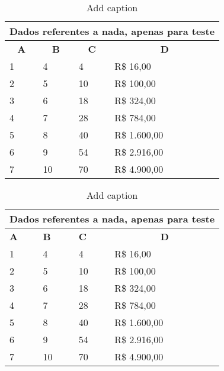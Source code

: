 \begin{table}[htbp]
	\centering
	\caption{Add caption}
	\begin{tabular}{m{2cm}|m{2cm}|m{2cm}|m{2.3cm}}
		\toprule
		\multicolumn{4}{c}{\textbf{Dados referentes a nada, apenas para teste}} \\
		\midrule
		\midrule
		\multicolumn{1}{c|}{\textcolor[rgb]{ 1,  0,  0}{\textbf{A}}} & \multicolumn{1}{c|}{\textcolor[rgb]{ 1,  0,  0}{\textbf{B}}} & \multicolumn{1}{c|}{\textcolor[rgb]{ 1,  0,  0}{\textbf{C}}} & \multicolumn{1}{c}{\textcolor[rgb]{ 1,  0,  0}{\textbf{D}}} \\
		\midrule
		\rowcolor[rgb]{ .851,  .851,  .851} 1     & 4     & 4     & R\$ 16,00 \\
		\midrule
		2     & 5     & 10    & R\$ 100,00 \\
		\midrule
		\rowcolor[rgb]{ .851,  .851,  .851} 3     & 6     & 18    & R\$ 324,00 \\
		\midrule
		4     & 7     & 28    & R\$ 784,00 \\
		\midrule
		\rowcolor[rgb]{ .851,  .851,  .851} 5     & 8     & 40    & R\$ 1.600,00 \\
		\midrule
		6     & 9     & 54    & R\$ 2.916,00 \\
		\midrule
		\rowcolor[rgb]{ .851,  .851,  .851} 7     & 10    & 70    & R\$ 4.900,00 \\
		\bottomrule
	\end{tabular}%
	\label{tab:addlabel}%
\end{table}%


\begin{table}[h]
	\centering
	\caption{Add caption}
	\begin{tabular}{m{2cm}|m{2cm}|m{2cm}|m{2.3cm}}
		\toprule
		\multicolumn{4}{c}{\textbf{Dados referentes a nada, apenas para teste}} \\
		\midrule
		\midrule
		\textcolor[rgb]{ 1,  0,  0}{\textbf{A}} & \textcolor[rgb]{ 1,  0,  0}{\textbf{B}} & \textcolor[rgb]{ 1,  0,  0}{\textbf{C}} & \multicolumn{1}{c}{\textcolor[rgb]{ 1,  0,  0}{\textbf{D}}} \\
		\midrule
		1     & 4     & 4     & R\$ 16,00 \\
		\midrule
		2     & 5     & 10    & R\$ 100,00 \\
		\midrule
		3     & 6     & 18    & R\$ 324,00 \\
		\midrule
		4     & 7     & 28    & R\$ 784,00 \\
		\midrule
		5     & 8     & 40    & R\$ 1.600,00 \\
		\midrule
		6     & 9     & 54    & R\$ 2.916,00 \\
		\midrule
		7     & 10    & 70    & R\$ 4.900,00 \\
		\bottomrule
		\bottomrule
	\end{tabular}%
	\label{tab:addlabel}%
\end{table}%



